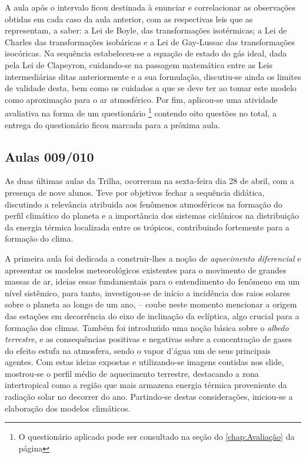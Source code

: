 A aula após o intervalo ficou destinada à enunciar e correlacionar as observações obtidas em cada caso da aula anterior, com as respectivas leis que as representam, a saber: a Lei de Boyle, das transformações isotérmicas; a Lei de Charles  das transformações isobáricas e a Lei de Gay-Lussac das transformações isocóricas. Na sequência estabeleceu-se a equação de estado do gás ideal, dada pela Lei de Clapeyron, cuidando-se na passagem matemática entre as Leis intermediárias ditas anteriormente e a sua formulação, discutiu-se ainda os limites de validade desta, bem como os cuidados a que se deve ter ao tomar este modelo como aproximação para o ar atmosférico. Por fim, aplicou-se uma atividade avaliativa na forma de um questionário \footnote{O questionário aplicado pode ser consultado na seção do \autoref{chap:Avaliação} da página \pageref{chap:Avaliação}} contendo oito questões no total, a entrega do questionário ficou marcada para a próxima aula.

\subsection{Aulas 009/010} %
\label{sub:Aulas 009/010}

As duas últimas aulas da Trilha, ocorreram na sexta-feira dia 28 de abril, com a presença de nove alunos. Teve por objetivos fechar a sequência didática, discutindo a relevância atribuida aos fenômenos atmosféricos na formação do perfil climático do planeta e a importância dos sistemas ciclônicos na distribuição da energia térmica localizada entre os trópicos, contribuindo fortemente para a formação do clima.

A primeira aula foi dedicada a construir-lhes a noção de \textit{aquecimento diferencial} e apresentar os modelos meteorológicos existentes para o movimento de grandes massas de ar, ideias essas fundamentais para o entendimento do fenômeno em um nível sistêmico, para tanto, investigou-se de início a incidência dos raios solares sobre o planeta ao longo de um ano, -- coube neste momento mencionar a origem das estações em decorrência do eixo de inclinação da eclíptica, algo crucial para a formação dos climas. Também foi introduzido uma noção básica sobre o \textit{albedo terrestre}, e as consequências positivas e negativas sobre a concentração de gases do efeito estufa na atmosfera, sendo o vapor d'água um de seus principais agentes. Com estas ideias expostas e utilizando-se imagens contidas nos slide, mostrou-se o perfil médio de aquecimento terrestre, destacando a zona intertropical como a região que mais armazena energia térmica proveniente da radiação solar no decorrer do ano. Partindo-se destas considerações, iniciou-se a elaboração dos modelos climáticos.

